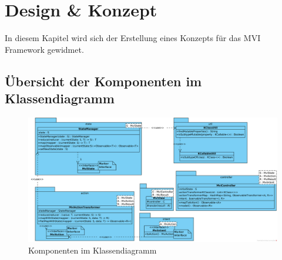 \section{Design \& Konzept}
\label{sec:design-und-konzept}
In diesem Kapitel wird sich der Erstellung eines Konzepts für das MVI Framework gewidmet. 

\subsection{Übersicht der Komponenten im Klassendiagramm}
\begin{figure}
		\includegraphics[width=1.1\textwidth]{./images/framework-class-diagram}
		\caption{Komponenten im Klassendiagramm}
\end{figure}
\clearpage
